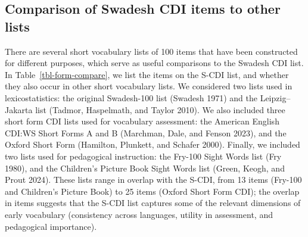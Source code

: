 \documentclass[
  letterpaper,
  DIV=11,
  numbers=noendperiod]{scrartcl}
\begin{document}
\subsection{Comparison of Swadesh CDI items to other
lists}\label{comparison-of-swadesh-cdi-items-to-other-lists}

There are several short vocabulary lists of 100 items that have been
constructed for different purposes, which serve as useful comparisons to
the Swadesh CDI list. In Table~\ref{tbl-form-compare}, we list the items
on the S-CDI list, and whether they also occur in other short vocabulary
lists. We considered two lists used in lexicostatistics: the original
Swadesh-100 list (Swadesh 1971) and the Leipzig--Jakarta list (Tadmor,
Haspelmath, and Taylor 2010). We also included three short form CDI
lists used for vocabulary assessment: the American English CDI:WS Short
Forms A and B (Marchman, Dale, and Fenson 2023), and the Oxford Short
Form (Hamilton, Plunkett, and Schafer 2000). Finally, we included two
lists used for pedagogical instruction: the Fry-100 Sight Words list
(Fry 1980), and the Children's Picture Book Sight Words list (Green,
Keogh, and Prout 2024). These lists range in overlap with the S-CDI,
from 13 items (Fry-100 and Children's Picture Book) to 25 items (Oxford
Short Form CDI); the overlap in items suggests that the S-CDI list
captures some of the relevant dimensions of early vocabulary
(consistency across languages, utility in assessment, and pedagogical
importance).

\begingroup
\setlength{}
\setlength{}\fontsize{7.5pt}{9.0pt}\selectfont
\end{document}
